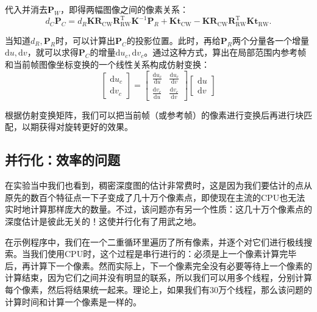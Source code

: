 代入并消去$\bm{P}_W$，即得两幅图像之间的像素关系：
\begin{equation}
d_C {\bm{P}_C} = d_R \bm{K} \bm{R}_{\mathrm{CW}} \bm{R}_{\mathrm{RW}}^\mathrm{T} \bm{K}^{-1} \bm{P}_R + \bm{K} \bm{t}_{\mathrm{CW}} - \bm{K} \bm{R}_{\mathrm{CW}} \bm{R}_{\mathrm{RW}}^\mathrm{T} \bm{K} \bm{t}_{\mathrm{RW}}.
\end{equation}

当知道$d_R, \bm{P}_R$时，可以计算出$\bm{P}_C$的投影位置。此时，再给$\bm{P}_R$两个分量各一个增量$\mathrm{d}u, \mathrm{d}v$，就可以求得$\bm{P}_C$的增量$\mathrm{d}u_c, \mathrm{d}v_c$。通过这种方式，算出在局部范围内参考帧和当前帧图像坐标变换的一个线性关系构成仿射变换：
\begin{equation}
\left[ \begin{array}{l}
\mathrm{d}u_c\\
\mathrm{d}v_c
\end{array} \right] = \left[ {\begin{array}{*{20}{c}}
	{\frac{{\mathrm{d}u_c}}{{\mathrm{d}u}}}&{\frac{{\mathrm{d}u_c}}{{\mathrm{d}v}}}\\
	{\frac{{\mathrm{d}v_c}}{{\mathrm{d}u}}}&{\frac{{\mathrm{d}v_c}}{{\mathrm{d}v}}}
	\end{array}} \right]\left[ \begin{array}{l}
\mathrm{d}u\\
\mathrm{d}v
\end{array} \right]
\end{equation}

根据仿射变换矩阵，我们可以把当前帧（或参考帧）的像素进行变换后再进行块匹配，以期获得对旋转更好的效果。

\subsection{并行化：效率的问题}
在实验当中我们也看到，稠密深度图的估计非常费时，这是因为我们要估计的点从原先的数百个特征点一下子变成了几十万个像素点，即使现在主流的CPU也无法实时地计算那样庞大的数量。不过，该问题亦有另一个性质：这几十万个像素点的深度估计是彼此无关的！这使并行化有了用武之地。

在示例程序中，我们在一个二重循环里遍历了所有像素，并逐个对它们进行极线搜索。当我们使用CPU时，这个过程是串行进行的：必须是上一个像素计算完毕后，再计算下一个像素。然而实际上，下一个像素完全没有必要等待上一个像素的计算结束，因为它们之间并没有明显的联系，所以我们可以用多个线程，分别计算每个像素，然后将结果统一起来。理论上，如果我们有30万个线程，那么该问题的计算时间和计算一个像素是一样的。

